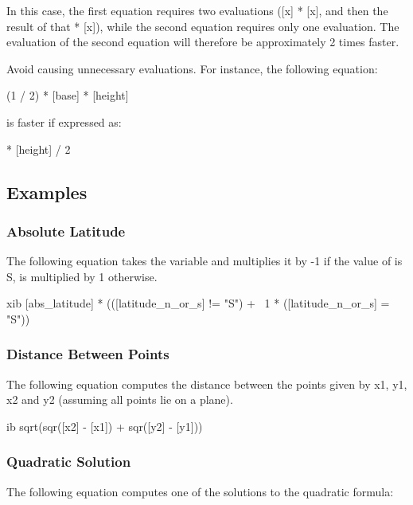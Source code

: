 In this case, the first equation requires two evaluations ([x] * [x],
and then the result of that * [x]), while the second equation requires
only one evaluation. The evaluation of the second equation will
therefore be approximately 2 times faster.

Avoid causing unnecessary evaluations. For instance, the following
equation:

\begin{example}
(1 / 2) * [base] * [height] 
\end{example}

is faster if expressed as: 

\begin{example}
[base] * [height] / 2 
\end{example}

\subsection{Examples}

\subsubsection{Absolute Latitude}

The following equation takes the variable  and
multiplies it by -1 if the value of  is S,
 is multiplied by 1 otherwise.

\begin{vcode}{xib}
[abs_latitude] * (([latitude_n_or_s] != "S") + ~1 * ([latitude_n_or_s] = "S")) 
\end{vcode}

\subsubsection{Distance Between Points}

The following equation computes the distance between the points given
by x1, y1, x2 and y2 (assuming all points lie on a plane).

\begin{vcode}{ib}
sqrt(sqr([x2] - [x1]) + sqr([y2] - [y1])) 
\end{vcode}

\subsubsection{Quadratic Solution}

The following equation computes one of the solutions to the quadratic
formula:

